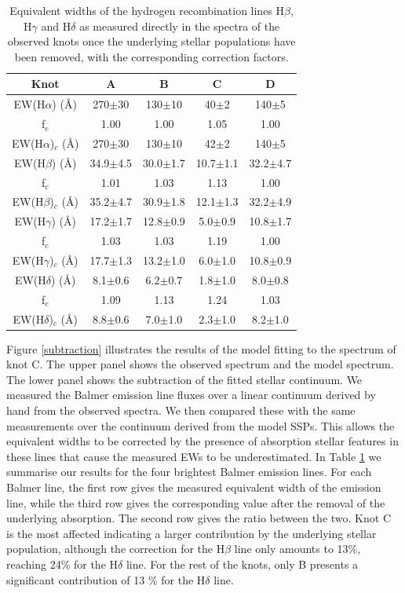 \documentclass[structabstract]{aa}
\begin{document}
\begin{table}
\centering
\caption[]{Equivalent widths of the hydrogen recombination lines H$\beta$, H$\gamma$ and
H$\delta$ as measured directly in the spectra of the observed knots 
once the underlying stellar populations have been removed, with the corresponding correction factors.}
\label{ews}
\begin{tabular} {c c c c c}
\hline
\hline
Knot  & A & B & C & D         \\
\hline
EW(H$\alpha$) (\AA) & 270$\pm$30 &  130$\pm$10 & 40$\pm$2 & 140$\pm$5 \\
f$_c$   &  1.00 & 1.00 & 1.05 & 1.00 \\
EW(H$\alpha$)$_c$ (\AA) & 270$\pm$30 &  130$\pm$10 & 42$\pm$2 & 140$\pm$5 \\
\hline
EW(H$\beta$) (\AA) & 34.9$\pm$4.5 &  30.0$\pm$1.7 & 10.7$\pm$1.1 & 32.2$\pm$4.7 \\
f$_c$   &  1.01 & 1.03 & 1.13 & 1.00 \\
EW(H$\beta$)$_c$ (\AA) & 35.2$\pm$4.7 &  30.9$\pm$1.8 & 12.1$\pm$1.3 & 32.2$\pm$4.9 \\
\hline
EW(H$\gamma$) (\AA) & 17.2$\pm$1.7 &  12.8$\pm$0.9 & 5.0$\pm$0.9 & 10.8$\pm$1.7 \\
f$_c$   &  1.03 & 1.03 & 1.19 & 1.00 \\
EW(H$\gamma$)$_c$ (\AA) & 17.7$\pm$1.3 &  13.2$\pm$1.0 & 6.0$\pm$1.0 & 10.8$\pm$0.9 \\
\hline
EW(H$\delta$) (\AA) & 8.1$\pm$0.6 &  6.2$\pm$0.7 & 1.8$\pm$1.0 & 8.0$\pm$0.8 \\
f$_c$   &  1.09 & 1.13 & 1.24 & 1.03 \\
EW(H$\delta$)$_c$ (\AA) & 8.8$\pm$0.6 &  7.0$\pm$1.0 & 2.3$\pm$1.0 & 8.2$\pm$1.0 \\
\hline

\hline
\end{tabular}
\end{table}


Figure \ref{subtraction} illustrates the results of the model fitting to the spectrum of knot C.
The upper panel shows the observed spectrum and the model spectrum.
The lower panel shows the subtraction of the fitted stellar continuum.
We measured the Balmer emission line fluxes over a linear continuum derived by hand from
the observed spectra. We then compared these with the same measurements over the continuum derived
from the model SSPs. This allows 
the equivalent widths to be corrected by the presence of absorption stellar
features in these lines that cause the measured EWs to be underestimated.
In Table \ref{ews} we summarise our results for the four brightest Balmer emission lines.
For each Balmer line, the first row gives the measured equivalent width of the emission line, while the third row gives the corresponding value after the removal of the underlying absorption. The second row gives the ratio between the two. Knot C is the most affected indicating a larger contribution by the underlying stellar population, although the correction for the H$\beta$ line only amounts to 13\%, reaching 24\% for the H$\delta$ line. For the rest of the knots, only B presents a significant contribution of 13 \% for the H$\delta$ line.
\end{document}
